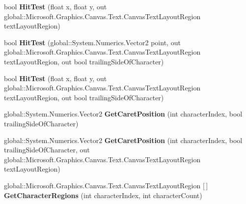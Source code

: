 \begin{DoxyCompactItemize}
bool {\bfseries Hit\+Test} (float x, float y, out global\+::\+Microsoft.\+Graphics.\+Canvas.\+Text.\+Canvas\+Text\+Layout\+Region text\+Layout\+Region)
\item 
\mbox{\label{class_microsoft_1_1_graphics_1_1_canvas_1_1_text_1_1_canvas_text_layout_a532b1b13e054c3c5b5547158050e3b94}} 
bool {\bfseries Hit\+Test} (global\+::\+System.\+Numerics.\+Vector2 point, out global\+::\+Microsoft.\+Graphics.\+Canvas.\+Text.\+Canvas\+Text\+Layout\+Region text\+Layout\+Region, out bool trailing\+Side\+Of\+Character)
\item 
\mbox{\label{class_microsoft_1_1_graphics_1_1_canvas_1_1_text_1_1_canvas_text_layout_a2bf7d833ba8cf12cacb9b8c441309e4e}} 
bool {\bfseries Hit\+Test} (float x, float y, out global\+::\+Microsoft.\+Graphics.\+Canvas.\+Text.\+Canvas\+Text\+Layout\+Region text\+Layout\+Region, out bool trailing\+Side\+Of\+Character)
\item 
\mbox{\label{class_microsoft_1_1_graphics_1_1_canvas_1_1_text_1_1_canvas_text_layout_ad61d630b4143924a996579c3c14e39bd}} 
global\+::\+System.\+Numerics.\+Vector2 {\bfseries Get\+Caret\+Position} (int character\+Index, bool trailing\+Side\+Of\+Character)
\item 
\mbox{\label{class_microsoft_1_1_graphics_1_1_canvas_1_1_text_1_1_canvas_text_layout_a570264c3b7269effae081d1e5a88df05}} 
global\+::\+System.\+Numerics.\+Vector2 {\bfseries Get\+Caret\+Position} (int character\+Index, bool trailing\+Side\+Of\+Character, out global\+::\+Microsoft.\+Graphics.\+Canvas.\+Text.\+Canvas\+Text\+Layout\+Region text\+Layout\+Region)
\item 
\mbox{\label{class_microsoft_1_1_graphics_1_1_canvas_1_1_text_1_1_canvas_text_layout_a7a2da41d929849793b28b02d8754c790}} 
global\+::\+Microsoft.\+Graphics.\+Canvas.\+Text.\+Canvas\+Text\+Layout\+Region \mbox{[}$\,$\mbox{]} {\bfseries Get\+Character\+Regions} (int character\+Index, int character\+Count)
\item 

\end{DoxyCompactItemize}
